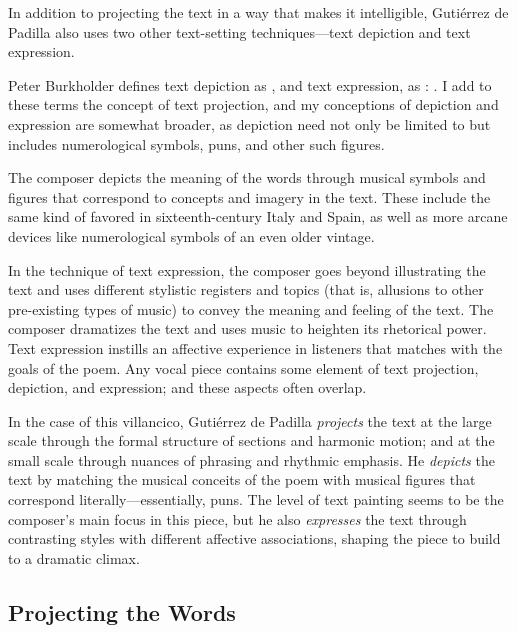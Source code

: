 In addition to projecting the text in a way that makes it intelligible,
Gutiérrez de Padilla also uses two other text-setting techniques---text
depiction and text expression.%
\begin{Footnote}
    Peter Burkholder defines text depiction as , and text expression, as
    : 
    \Autocite[207]{Burkholder:History}.
    I add to these terms the concept of text projection, and my conceptions of
    depiction and expression are somewhat broader, as depiction need not only
    be limited to  but includes numerological symbols,
    puns, and other such figures.
\end{Footnote}
The composer depicts the meaning of the words through musical symbols and
figures that correspond to concepts and imagery in the text.
These include the same kind of  favored in
sixteenth-century Italy and Spain, as well as more arcane devices like
numerological symbols of an even older vintage.

In the technique of text expression, the composer goes beyond illustrating the
text and uses different stylistic registers and topics (that is, allusions to
other pre-existing types of music) to convey the meaning and feeling of the
text.
The composer dramatizes the text and uses music to heighten its rhetorical
power.
Text expression instills an affective experience in listeners that matches with
the goals of the poem.
Any vocal piece contains some element of text projection, depiction, and
expression; and these aspects often overlap.

In the case of this villancico, Gutiérrez de Padilla \emph{projects} the text at
the large scale through the formal structure of sections and harmonic motion;
and at the small scale through nuances of phrasing and rhythmic emphasis.
He \emph{depicts} the text by matching the musical conceits of the poem with
musical figures that correspond literally---essentially, puns.
The level of text painting seems to be the composer's main focus in this piece,
but he also \emph{expresses} the text through contrasting styles with different
affective associations, shaping the piece to build to a dramatic climax.

\subsection{Projecting the Words}

